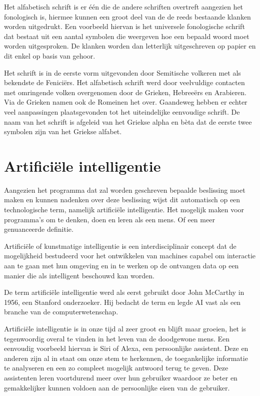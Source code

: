 Het alfabetisch schrift is er één die de andere schriften overtreft aangezien het fonologisch is, hiermee kunnen een groot deel van de de reeds bestaande klanken worden uitgedrukt.
Een voorbeeld hiervan is het universele fonologische schrift dat bestaat uit een aantal symbolen die weergeven hoe een bepaald woord moet worden uitgesproken.
De klanken worden dan letterlijk uitgeschreven op papier en dit enkel op basis van gehoor.


\autocite{Rickandie2016} Het schrift is in de eerste vorm uitgevonden door Semitische volkeren met als bekendste de Feniciërs. Het alfabetisch schrift werd door veelvuldige contacten met omringende volken overgenomen door de Grieken, Hebreeërs en Arabieren. Via de Grieken namen ook de Romeinen het over. Gaandeweg hebben er echter veel aanpassingen plaatsgevonden tot het uiteindelijke eenvoudige schrift. De naam van het schrift is afgeleid van het Griekse alpha en bèta dat de eerste twee symbolen zijn van het Griekse alfabet.


\section{Artificiële intelligentie}

Aangezien het programma dat zal worden geschreven bepaalde beslissing moet maken en kunnen nadenken over deze beslissing wijst dit automatisch op een technologische term, namelijk artificiële intelligentie.
Het mogelijk maken voor programma's om te denken, doen en leren als een mens.
Of een meer genuanceerde definitie.

Artificiële of kunstmatige intelligentie is een interdisciplinair concept dat de mogelijkheid bestudeerd voor het ontwikkelen van machines capabel om interactie aan te gaan met hun omgeving en in te werken op de ontvangen data op een manier die als intelligent beschouwd kan worden.

De term artificiële intelligentie werd als eerst gebruikt door John McCarthy in 1956, een Stanford onderzoeker.
Hij bedacht de term en legde AI vast als een branche van de computerwetenschap.

Artificiële intelligentie is in onze tijd al zeer groot en blijft maar groeien, het is tegenwoordig overal te vinden in het leven van de doodgewone mens.
Een eenvoudig voorbeeld hiervan is Siri of Alexa, een persoonlijke assistent. Deze en anderen zijn al in staat om onze stem te herkennen, de toegankelijke informatie te analyseren en een zo compleet mogelijk antwoord terug te geven. Deze assistenten leren voortdurend meer over hun gebruiker waardoor ze beter en gemakkelijker kunnen voldoen aan de persoonlijke eisen van de gebruiker.

